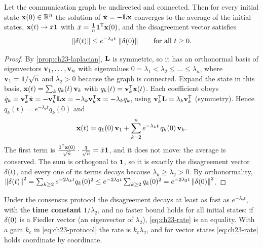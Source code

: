 \begin{theorem}
\label{thm:ch23-consensus}
Let the communication graph be undirected and connected. Then for every
initial state $\mathbf{x}(0) \in \mathbb{R}^n$ the solution of
$\dot{\mathbf{x}} = -\mathbf{L}\mathbf{x}$ converges to the average of the initial
states, $\mathbf{x}(t) \to \bar{x}\mathbf{1}$ with $\bar{x} =
\frac{1}{n}\mathbf{1}^{\mathsf{T}}\mathbf{x}(0)$, and the disagreement vector satisfies
\begin{equation}
  \left\lVert \mathbf{\delta}(t) \right\rVert \le e^{-\lambda_2 t}\,\left\lVert \mathbf{\delta}(0) \right\rVert
  \qquad\text{for all } t \ge 0.
  \label{eq:ch23-rate}
\end{equation}
\end{theorem}
\begin{proof}
By \cref{prop:ch23-laplacian}, $\mathbf{L}$ is symmetric, so it has an
orthonormal basis of eigenvectors $\mathbf{v}_1, \dots, \mathbf{v}_n$ with
eigenvalues $0 = \lambda_1 < \lambda_2 \le \dots \le \lambda_n$, where
$\mathbf{v}_1 = \mathbf{1}/\sqrt{n}$ and $\lambda_2 > 0$ because the graph is
connected. Expand the state in this basis, $\mathbf{x}(t) = \sum_k q_k(t)\,
\mathbf{v}_k$ with $q_k(t) = \mathbf{v}_k^{\mathsf{T}}\mathbf{x}(t)$. Each coefficient obeys
$\dot{q}_k = \mathbf{v}_k^{\mathsf{T}}\dot{\mathbf{x}} = -\mathbf{v}_k^{\mathsf{T}}\mathbf{L}\mathbf{x} =
-\lambda_k \mathbf{v}_k^{\mathsf{T}}\mathbf{x} = -\lambda_k q_k$, using
$\mathbf{v}_k^{\mathsf{T}}\mathbf{L} = \lambda_k\mathbf{v}_k^{\mathsf{T}}$ (symmetry). Hence
$q_k(t) = e^{-\lambda_k t} q_k(0)$ and
\begin{equation}
  \mathbf{x}(t) = q_1(0)\,\mathbf{v}_1 + \sum_{k=2}^{n} e^{-\lambda_k t}\, q_k(0)\,\mathbf{v}_k .
  \label{eq:ch23-modes}
\end{equation}
The first term is $\frac{\mathbf{1}^{\mathsf{T}}\mathbf{x}(0)}{\sqrt{n}}\cdot\frac{\mathbf{1}}{\sqrt{n}}
= \bar{x}\mathbf{1}$, and it does not move: the average is conserved. The sum is
orthogonal to $\mathbf{1}$, so it is exactly the disagreement vector
$\mathbf{\delta}(t)$, and every one of its terms decays because $\lambda_k \ge
\lambda_2 > 0$. By orthonormality,
$\left\lVert \mathbf{\delta}(t) \right\rVert^2 = \sum_{k \ge 2} e^{-2\lambda_k t} q_k(0)^2 \le
e^{-2\lambda_2 t} \sum_{k \ge 2} q_k(0)^2 = e^{-2\lambda_2 t}\left\lVert \mathbf{\delta}(0) \right\rVert^2$.
\end{proof}

\begin{corollary}
\label{cor:ch23-rate}
Under the consensus protocol the disagreement decays at least as fast as
$e^{-\lambda_2 t}$, with the \textbf{time constant} $1/\lambda_2$, and no
faster bound holds for all initial states: if $\mathbf{\delta}(0)$ is a Fiedler
vector (an eigenvector of $\lambda_2$), \cref{eq:ch23-rate} is an equality.
With a gain $k_c$ in \cref{eq:ch23-protocol} the rate is $k_c\lambda_2$, and for
vector states \cref{eq:ch23-rate} holds coordinate by coordinate.
\end{corollary}


